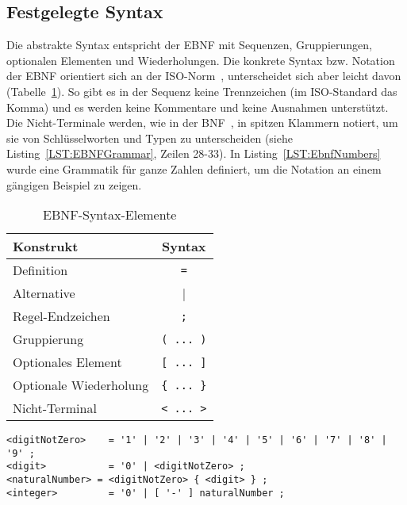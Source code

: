 \documentclass[../InterneDSLs.tex]{subfiles}
\begin{document}
\subsection{Festgelegte Syntax}\label{SEC:SetSyntax}
Die abstrakte Syntax entspricht der EBNF mit Sequenzen, Gruppierungen, optionalen Elementen und Wiederholungen. Die konkrete Syntax bzw. Notation der EBNF orientiert sich an der ISO-Norm~\cite[S. 7]{scowen1996international}, unterscheidet sich aber leicht davon (Tabelle~\ref{TAB:EBNFSyntax}). So gibt es in der Sequenz keine Trennzeichen (im ISO-Standard das Komma) und es werden keine Kommentare und keine Ausnahmen unterstützt. Die Nicht-Terminale werden, wie in der BNF~\cite[S. 3]{crocker1997augmented}, in spitzen Klammern notiert, um sie von Schlüsselworten und Typen zu unterscheiden (siehe Listing~\ref{LST:EBNFGrammar}, Zeilen 28-33). In Listing~\ref{LST:EbnfNumbers} wurde eine Grammatik für ganze Zahlen definiert, um die Notation an einem gängigen Beispiel zu zeigen.

\begin{table}[ht]
\centering
\begin{tabular}{l|c}
\textbf{Konstrukt}     & \textbf{Syntax}\\\hline
Definition             & \verb|=|\\
Alternative            & |\\
Regel-Endzeichen       & \verb|;|\\
Gruppierung            & \verb|( ... )|\\
Optionales Element     & \verb|[ ... ]|\\
Optionale Wiederholung & \verb|{ ... }|\\
Nicht-Terminal         & \verb|< ... >|\\
\end{tabular}
\caption{EBNF-Syntax-Elemente}
\label{TAB:EBNFSyntax}
\end{table}

\begin{lstlisting}[caption={Zahlen in der festgelegten Notation},label={LST:EbnfNumbers}]
<digitNotZero>    = '1' | '2' | '3' | '4' | '5' | '6' | '7' | '8' | '9' ;
<digit>           = '0' | <digitNotZero> ;
<naturalNumber> = <digitNotZero> { <digit> } ;
<integer>         = '0' | [ '-' ] naturalNumber ;
\end{lstlisting}

\begin{figure}[ht]

\end{figure}
\end{document}
